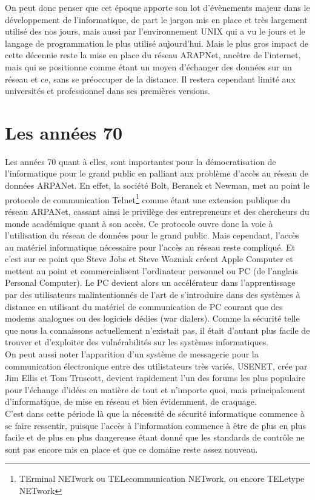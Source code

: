 \documentclass[a4paper]{memoir}
\begin{document}
On peut donc penser que cet époque apporte son lot d'évènements majeur dans le développement de l'informatique, de part le jargon mis en place et très largement utilisé des nos jours, mais aussi par l'environnement UNIX qui a vu le jours et le langage de programmation le plus utilisé aujourd'hui. Mais le plus gros impact de cette décennie reste la mise en place du réseau ARAPNet, ancêtre de l'internet, mais qui se positionne comme étant un moyen d'échanger des données sur un réseau et ce, sans se préoccuper de la distance. Il restera cependant limité aux universités et professionnel dans ses premières versions.

\section{Les années 70}

Les années 70 quant à elles, sont importantes pour la démocratisation de l'informatique pour le grand public en palliant aux problème d'accès au réseau de données ARPANet. En effet, la société Bolt, Beranek et Newman, met au point le protocole de communication Telnet\footnote{TErminal NETwork ou TELecommunication NETwork, ou encore TELetype NETwork} comme étant une extension publique du réseau ARPANet, cassant ainsi le privilège des entrepreneurs et des chercheurs du monde académique quant à son accès. Ce protocole ouvre donc la voie à l'utilisation du réseau de données pour le grand public. Mais cependant, l'accès au matériel informatique nécessaire pour l'accès au réseau reste compliqué. Et c'est sur ce point que Steve Jobs et Steve Wozniak créent Apple Computer et mettent au point et commercialisent l'ordinateur personnel ou PC (de l'anglais Personal Computer). Le PC devient alors un accélérateur dans l'apprentissage par des utilisateurs malintentionnés de l'art de s'introduire dans des systèmes à distance en utilisant du matériel de communication de PC courant que des modems analogues ou des logiciels dédies (war dialers). Comme la sécurité telle que nous la connaissons actuellement n'existait pas, il était d'autant plus facile de trouver et d'exploiter des vulnérabilités sur les systèmes informatiques.\\
\noindent On peut aussi noter l'apparition d'un système de messagerie pour la communication électronique entre des utilistateurs très variés. USENET, crée par Jim Ellis et Tom Truscott, devient rapidement l'un des forums les plus populaire pour l'échange d'idées en matière de tout et n'importe quoi, mais principalement d'informatique, de mise en réseau et bien évidemment, de craquage.\\
C'est dans cette période là que la nécessité de sécurité informatique commence à se faire ressentir, puisque l'accès à l'information commence à être de plus en plus facile et de plus en plus dangereuse étant donné que les standards de contrôle ne sont pas encore mis en place et que ce domaine reste assez nouveau.
\end{document}
